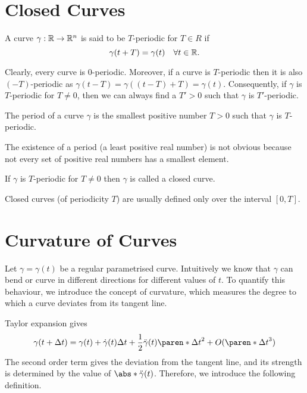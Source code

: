 \documentclass[11pt]{penrose}
\newcommand{\keyword}[1]{\textsf{#1}}
\begin{document}
\section{Closed Curves}
\begin{ndfn}
    A curve $\gamma : \mathbb{R} \to \mathbb{R}^n$ is said to be \keyword{$T$-periodic} for $T \in R$ if
    \begin{equation}
        \gamma(t + T) = \gamma(t)
        \quad\forall t \in \mathbb{R}.
    \end{equation}
\end{ndfn}

Clearly, every curve is $0$-periodic. Moreover, if a curve is $T$-periodic then it is also $(-T)$-periodic as $\gamma(t - T) = \gamma((t-T) + T) = \gamma(t)$. Consequently, if $\gamma$ is $T$-periodic for $T \neq 0$, then we can always find a $T' > 0$ such that $\gamma$ is $T'$-periodic.

\begin{ndfn}
    The \keyword{period} of a curve $\gamma$ is the smallest positive number $T > 0$ such that $\gamma$ is $T$-periodic.
\end{ndfn}

The existence of a period (a least positive real number) is not obvious because not every set of positive real numbers has a smallest element.

\begin{ndfn}
    If $\gamma$ is $T$-periodic for $T \neq 0$ then $\gamma$ is called a \keyword{closed curve}.
\end{ndfn}

Closed curves (of periodicity $T$) are usually defined only over the interval $[0, T]$.

\section{Curvature of Curves}
Let $\gamma = \gamma(t)$ be a regular parametrised curve. Intuitively we know that $\gamma$ can bend or curve in different directions for different values of $t$. To quantify this behaviour, we introduce the concept of \keyword{curvature}, which measures the degree to which a curve deviates from its tangent line.

Taylor expansion gives
\begin{equation}
    \gamma(t + \Delta t) = \gamma(t) + \dot{\gamma}(t) \Delta t + \frac{1}{2} \ddot{\gamma}(t) \paren*{\Delta t}^2 + O(\paren*{\Delta t}^3)
\end{equation}
The second order term gives the deviation from the tangent line, and its strength is determined by the value of $\abs*{\ddot{\gamma}(t)}$. Therefore, we introduce the following definition.
\end{document}
